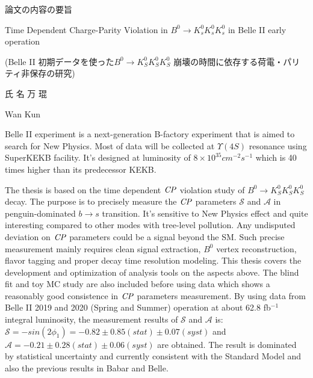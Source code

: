\documentclass[10.5pt,twoside]{mitthesis}
\begin{document}
\begin{CJK}{UTF8}{min}
	\large
	\centering
	論文の内容の要旨\\
\end{CJK}

\begin{center}
	\large
	Time Dependent Charge-Parity Violation in $B^0 \to K^0_s K^0_s K^0_s $ in Belle II early operation\\
\end{center}
\begin{CJK}{UTF8}{min}
	\large
	\centering
	(Belle II 初期データを使った$B^0 \to K_S^0  K_S^0  K_S^0$ 崩壊の時間に依存する荷電・パリティ非保存の研究)\\
	\vspace{1cm}
\end{CJK}
\begin{CJK}{UTF8}{min}
	\large
	\centering
	氏 名 \space \space \space \space  万 琨\\
\end{CJK}
\begin{center}
	\large
	Wan Kun\\
\end{center}
\vspace{1cm}
Belle II experiment is a next-generation B-factory experiment that is aimed to search for New Physics. Most of data will be collected at $\Upsilon(4S)$ resonance using SuperKEKB facility. It's designed at luminosity of $8 \times 10^{35} cm^{-2}s^{-1}$ which is 40 times higher than its predecessor KEKB.

The thesis is based on the time dependent $\it{CP}$ violation study of $B^0 \to K_S^0 K_S^0 K_S^0$ decay. The purpose is to precisely measure the $\it{CP}$ parameters $\mathcal{S}$ and $\mathcal{A}$ in penguin-dominated $b \to s$ transition. It's sensitive to New Physics effect and quite interesting compared to other modes with tree-level pollution. Any undisputed deviation on $\it{CP}$ parameters could be a signal beyond the SM. Such precise measurement mainly requires clean signal extraction, $B^0$ vertex reconstruction, flavor tagging and proper decay time resolution modeling. This thesis covers the development and optimization of analysis tools on the aspects above. The blind fit and toy MC study are also included before using data which shows a reasonably good consistence in $\it{CP}$ parameters measurement. By using data from Belle II 2019 and 2020 (Spring and Summer) operation at about 62.8 fb$^{-1}$ integral luminosity, the measurement results of $\mathcal{S}$ and $\mathcal{A}$ is: $\mathcal{S}= - sin(2\phi_1) = -0.82 \pm 0.85(stat) \pm 0.07(syst)$ and $\mathcal{A}= -0.21 \pm 0.28(stat) \pm 0.06(syst)$ are obtained. The result is dominated by statistical uncertainty and currently consistent with the Standard Model and also the previous results in Babar and Belle. 
\end{document}

